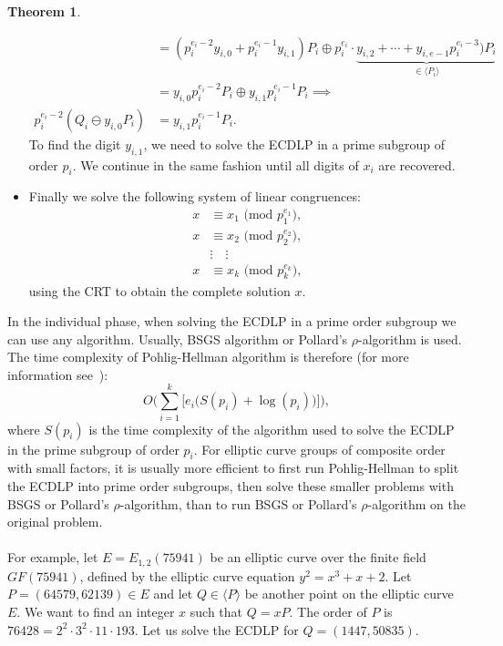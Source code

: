 \documentclass[thesis=M,english]{FITthesis}[2012/10/20]
\theoremstyle{remark}
\theoremstyle{definition}
\newtheorem{theorem}{Theorem}[section]
\begin{document}
\begin{theorem}
\begin{itemize}
\begin{align*}
&= (p_i^{e_i-2}y_{i,0} + p_i^{e_i-1}y_{i,1})P_i \oplus p_i^{e_i}\cdot\underbrace{y_{i,2}+ \cdots + y_{i,e-1}p_i^{e_i-3})P_i}_{\in \langle P_i \rangle} \\
&= y_{i,0}p_i^{e_i-2}P_i \oplus y_{i,1}p_i^{e_i-1}P_i \implies \\
p_i^{e_i-2}(Q_i \ominus y_{i,0}P_i) &= y_{i,1}p_i^{e_i-1}P_i.
\end{align*}
To find the digit $y_{i,1}$, we need to solve the ECDLP in a prime subgroup of order $p_i$. We continue in the same fashion until all digits of $x_i$ are recovered.
\item Finally we solve the following system of linear congruences:
\begin{align*}
x &\equiv x_1 \text{ (mod $p_1^{e_1}$)}, \\
x &\equiv x_2 \text{ (mod $p_2^{e_2}$)}, \\
&\vdots \quad \vdots \\
x &\equiv x_k \text{ (mod $p_k^{e_k}$)},
\end{align*}
using the CRT to obtain the complete solution $x$.
\end{itemize}
\end{theorem}
\noindent In the individual phase, when solving the ECDLP in a prime order subgroup we can use any algorithm. Usually, BSGS algorithm or Pollard's $\rho$-algorithm is used. The time complexity of Pohlig-Hellman algorithm is therefore (for more information see~\cite{mky}):
$$
O\bigg(\sum_{i=1}^k\bigg[e_i\big(S(p_i) + \log(p_i)\big)\bigg]\bigg),
$$ where $S(p_i)$ is the time complexity of the algorithm used to solve the ECDLP in the prime subgroup of order $p_i$. For elliptic curve groups of composite order with small factors, it is usually more efficient to first run Pohlig-Hellman to split the ECDLP into prime order subgroups, then solve these smaller problems with BSGS or Pollard's $\rho$-algorithm, than to run BSGS or Pollard's $\rho$-algorithm on the original problem. \\\\
\noindent For example, let $E = E_{1,2}(75941)$ be an elliptic curve over the finite field $GF(75941)$, defined by the elliptic curve equation $y^2 = x^3 + x + 2$. Let $P = (64579,62139) \in E$ and let $Q \in \langle P \rangle$ be another point on the elliptic curve $E$. We want to find an integer $x$ such that $Q = xP.$ The order of $P$ is $76428 = 2^2\cdot 3^2\cdot 11 \cdot 193$. Let us solve the ECDLP for $Q = (1447, 50835)$. \\ \\
\end{document}
